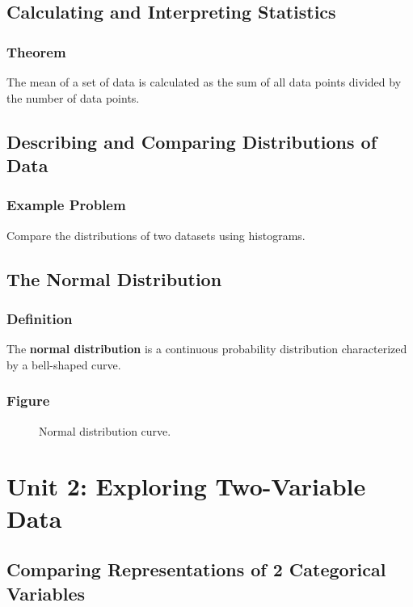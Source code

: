 \subsection{Calculating and Interpreting Statistics}
\subsubsection{Theorem}
\begin{theorem}
The mean of a set of data is calculated as the sum of all data points divided by the number of data points.
\end{theorem}

\subsection{Describing and Comparing Distributions of Data}
\subsubsection{Example Problem}
\begin{example}
Compare the distributions of two datasets using histograms.
\end{example}

\subsection{The Normal Distribution}
\subsubsection{Definition}
\begin{definition}
The \textbf{normal distribution} is a continuous probability distribution characterized by a bell-shaped curve.
\end{definition}

\subsubsection{Figure}
\begin{figure}[h!]
\centering
\caption{Normal distribution curve.}
\end{figure}

\section{Unit 2: Exploring Two-Variable Data}
\subsection{Comparing Representations of 2 Categorical Variables}
